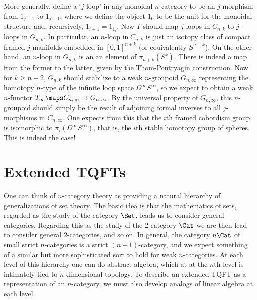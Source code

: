 More generally, define a `$j$-loop' in any monoidal $n$-category
to be an $j$-morphism from $1_{j-1}$ to $1_{j-1}$, where we
define the object $1_0$ to be the unit for the monoidal structure
and, recursively, $1_{i+1} = 1_{1_i}$.  Now $T$ should map
$j$-loops in $C_{n,k}$ to $j$-loops in $G_{n,k}$.  In particular,
an $n$-loop in $C_{n,k}$ is just an isotopy class of compact
framed $j$-manifolds embedded in $[0,1]^{n+k}$ (or equivalently
$S^{n+k}$).   On the other hand, an $n$-loop in $G_{n,k}$ is an
an element of $\pi_{n+k}(S^k)$.  There is indeed a map from the
former to the latter, given by the Thom-Pontryagin construction.
Now for $k \ge n+2$, $G_{n,k}$ should stabilize to a weak
$n$-groupoid $G_{n,\infty}$ representing the homotopy $n$-type of
the infinite loop space $\Omega^\infty S^\infty$, so we expect to
obtain a weak $n$-functor $T_\infty \maps C_{n,\infty} \to
G_{n,\infty}$.   By the universal property of $G_{n,\infty}$,
this $n$-groupoid should simply be the result of adjoining
formal inverses to all $j$-morphisms in $C_{n,\infty}$.   One
expects from this that the $i$th framed cobordism group is
isomorphic to $\pi_i(\Omega^\infty S^\infty)$, that is, the $i$th
stable homotopy group of spheres.  This is indeed the case!

\section{Extended TQFTs}

One can think of $n$-category theory as providing a natural
hierarchy of generalizations of set theory.   The
basic idea is that the mathematics of sets, regarded
as the study of the category $\Set$, leads us
to consider general categories.  Regarding this as the
study of the 2-category $\Cat$ we are then lead to consider
general 2-categories, and so on.  In general, the category
$n\Cat$ of small strict $n$-categories is a strict
$(n+1)$-category, and we expect something of a similar but more
sophisticated sort to hold for weak $n$-categories.
At each level of this hierarchy one can do abstract algebra,
which at at the $n$th level is intimately tied to $n$-dimensional
topology.   To describe an extended TQFT as a representation of
an $n$-category, we must also develop analogs of linear
algebra at each level.

